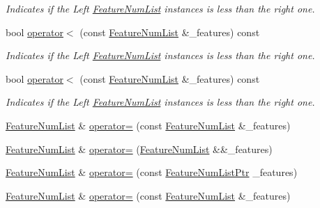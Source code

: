 \begin{DoxyCompactItemize}
\begin{DoxyCompactList}\small\item\em Indicates if the Left \hyperlink{class_k_k_m_l_l_1_1_feature_num_list}{Feature\+Num\+List} instances is less than the right one. \end{DoxyCompactList}\item 
bool \hyperlink{class_k_k_m_l_l_1_1_feature_num_list_a0587d700444f04e261fa1c1f39f430eb}{operator$<$} (const \hyperlink{class_k_k_m_l_l_1_1_feature_num_list}{Feature\+Num\+List} \&\+\_\+features) const 
\begin{DoxyCompactList}\small\item\em Indicates if the Left \hyperlink{class_k_k_m_l_l_1_1_feature_num_list}{Feature\+Num\+List} instances is less than the right one. \end{DoxyCompactList}\item 
bool \hyperlink{class_k_k_m_l_l_1_1_feature_num_list_a0587d700444f04e261fa1c1f39f430eb}{operator$<$} (const \hyperlink{class_k_k_m_l_l_1_1_feature_num_list}{Feature\+Num\+List} \&\+\_\+features) const 
\begin{DoxyCompactList}\small\item\em Indicates if the Left \hyperlink{class_k_k_m_l_l_1_1_feature_num_list}{Feature\+Num\+List} instances is less than the right one. \end{DoxyCompactList}\item 
\hyperlink{class_k_k_m_l_l_1_1_feature_num_list}{Feature\+Num\+List} \& \hyperlink{class_k_k_m_l_l_1_1_feature_num_list_a8ed98cfd85a47e75d833fbce3c11f9c9}{operator=} (const \hyperlink{class_k_k_m_l_l_1_1_feature_num_list}{Feature\+Num\+List} \&\+\_\+features)
\item 
\hyperlink{class_k_k_m_l_l_1_1_feature_num_list}{Feature\+Num\+List} \& \hyperlink{class_k_k_m_l_l_1_1_feature_num_list_abbbd4c62052494ac2eebb68312b3c8df}{operator=} (\hyperlink{class_k_k_m_l_l_1_1_feature_num_list}{Feature\+Num\+List} \&\&\+\_\+features)
\item 
\hyperlink{class_k_k_m_l_l_1_1_feature_num_list}{Feature\+Num\+List} \& \hyperlink{class_k_k_m_l_l_1_1_feature_num_list_a13682d1fba9cebda0c8a131ec57fdf54}{operator=} (const \hyperlink{class_k_k_m_l_l_1_1_feature_num_list_a8c7e53951a6f552a3f5e45c599ef05be}{Feature\+Num\+List\+Ptr} \+\_\+features)
\item 
\hyperlink{class_k_k_m_l_l_1_1_feature_num_list}{Feature\+Num\+List} \& \hyperlink{class_k_k_m_l_l_1_1_feature_num_list_a76474357e9d29d64cfa41a82114499ab}{operator=} (const \hyperlink{class_k_k_m_l_l_1_1_feature_num_list}{Feature\+Num\+List} \&\+\_\+features)

\end{DoxyCompactItemize}
